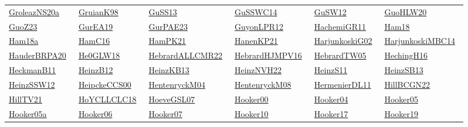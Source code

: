 \begin{longtable}{*{6}{l}}
\href{works/GroleazNS20a.pdf}{GroleazNS20a}~\cite{GroleazNS20a} & \href{works/GruianK98.pdf}{GruianK98}~\cite{GruianK98} & \href{works/GuSS13.pdf}{GuSS13}~\cite{GuSS13} & \href{}{GuSSWC14}~\cite{GuSSWC14} & \href{works/GuSW12.pdf}{GuSW12}~\cite{GuSW12} & \href{}{GuoHLW20}~\cite{GuoHLW20}\\ 
\href{}{GuoZ23}~\cite{GuoZ23} & \href{works/GurEA19.pdf}{GurEA19}~\cite{GurEA19} & \href{works/GurPAE23.pdf}{GurPAE23}~\cite{GurPAE23} & \href{works/GuyonLPR12.pdf}{GuyonLPR12}~\cite{GuyonLPR12} & \href{works/HachemiGR11.pdf}{HachemiGR11}~\cite{HachemiGR11} & \href{works/Ham18.pdf}{Ham18}~\cite{Ham18}\\ 
\href{}{Ham18a}~\cite{Ham18a} & \href{works/HamC16.pdf}{HamC16}~\cite{HamC16} & \href{works/HamPK21.pdf}{HamPK21}~\cite{HamPK21} & \href{works/HanenKP21.pdf}{HanenKP21}~\cite{HanenKP21} & \href{works/HarjunkoskiG02.pdf}{HarjunkoskiG02}~\cite{HarjunkoskiG02} & \href{}{HarjunkoskiMBC14}~\cite{HarjunkoskiMBC14}\\ 
\href{}{HauderBRPA20}~\cite{HauderBRPA20} & \href{works/He0GLW18.pdf}{He0GLW18}~\cite{He0GLW18} & \href{works/HebrardALLCMR22.pdf}{HebrardALLCMR22}~\cite{HebrardALLCMR22} & \href{works/HebrardHJMPV16.pdf}{HebrardHJMPV16}~\cite{HebrardHJMPV16} & \href{works/HebrardTW05.pdf}{HebrardTW05}~\cite{HebrardTW05} & \href{works/HechingH16.pdf}{HechingH16}~\cite{HechingH16}\\ 
\href{works/HeckmanB11.pdf}{HeckmanB11}~\cite{HeckmanB11} & \href{works/HeinzB12.pdf}{HeinzB12}~\cite{HeinzB12} & \href{works/HeinzKB13.pdf}{HeinzKB13}~\cite{HeinzKB13} & \href{works/HeinzNVH22.pdf}{HeinzNVH22}~\cite{HeinzNVH22} & \href{works/HeinzS11.pdf}{HeinzS11}~\cite{HeinzS11} & \href{works/HeinzSB13.pdf}{HeinzSB13}~\cite{HeinzSB13}\\ 
\href{works/HeinzSSW12.pdf}{HeinzSSW12}~\cite{HeinzSSW12} & \href{works/HeipckeCCS00.pdf}{HeipckeCCS00}~\cite{HeipckeCCS00} & \href{works/HentenryckM04.pdf}{HentenryckM04}~\cite{HentenryckM04} & \href{works/HentenryckM08.pdf}{HentenryckM08}~\cite{HentenryckM08} & \href{works/HermenierDL11.pdf}{HermenierDL11}~\cite{HermenierDL11} & \href{}{HillBCGN22}~\cite{HillBCGN22}\\ 
\href{works/HillTV21.pdf}{HillTV21}~\cite{HillTV21} & \href{works/HoYCLLCLC18.pdf}{HoYCLLCLC18}~\cite{HoYCLLCLC18} & \href{works/HoeveGSL07.pdf}{HoeveGSL07}~\cite{HoeveGSL07} & \href{}{Hooker00}~\cite{Hooker00} & \href{works/Hooker04.pdf}{Hooker04}~\cite{Hooker04} & \href{works/Hooker05.pdf}{Hooker05}~\cite{Hooker05}\\ 
\href{works/Hooker05a.pdf}{Hooker05a}~\cite{Hooker05a} & \href{works/Hooker06.pdf}{Hooker06}~\cite{Hooker06} & \href{works/Hooker07.pdf}{Hooker07}~\cite{Hooker07} & \href{}{Hooker10}~\cite{Hooker10} & \href{works/Hooker17.pdf}{Hooker17}~\cite{Hooker17} & \href{works/Hooker19.pdf}{Hooker19}~\cite{Hooker19}\\ 

\end{longtable}
